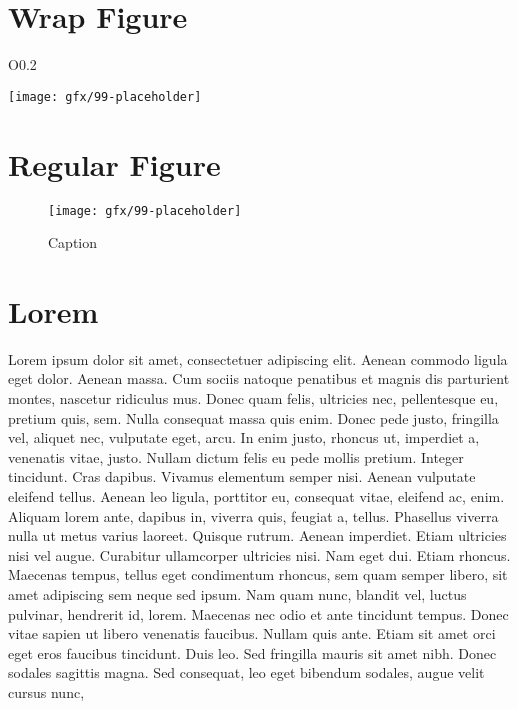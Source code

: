 \section{Wrap Figure}
\begin{wrapfigure}{O}{0.2\textwidth}
	\caption{} %
	\label{03:fig02} 
	\centering
	\texttt{[image: gfx/99-placeholder]} 
\end{wrapfigure}


\section{Regular Figure}
\begin{figure}[H]
	\centering
	\texttt{[image: gfx/99-placeholder]}
	\caption{Caption}
	\label{03:fig03}
\end{figure}



\section{Lorem}
Lorem ipsum dolor sit amet, consectetuer adipiscing elit. Aenean commodo ligula eget dolor. Aenean massa. Cum sociis natoque penatibus et magnis dis parturient montes, nascetur ridiculus mus. Donec quam felis, ultricies nec, pellentesque eu, pretium quis, sem. Nulla consequat massa quis enim. Donec pede justo, fringilla vel, aliquet nec, vulputate eget, arcu. In enim justo, rhoncus ut, imperdiet a, venenatis vitae, justo. Nullam dictum felis eu pede mollis pretium. Integer tincidunt. Cras dapibus. Vivamus elementum semper nisi. Aenean vulputate eleifend tellus. Aenean leo ligula, porttitor eu, consequat vitae, eleifend ac, enim. Aliquam lorem ante, dapibus in, viverra quis, feugiat a, tellus. Phasellus viverra nulla ut metus varius laoreet. Quisque rutrum. Aenean imperdiet. Etiam ultricies nisi vel augue. Curabitur ullamcorper ultricies nisi. Nam eget dui. Etiam rhoncus. Maecenas tempus, tellus eget condimentum rhoncus, sem quam semper libero, sit amet adipiscing sem neque sed ipsum. Nam quam nunc, blandit vel, luctus pulvinar, hendrerit id, lorem. Maecenas nec odio et ante tincidunt tempus. Donec vitae sapien ut libero venenatis faucibus. Nullam quis ante. Etiam sit amet orci eget eros faucibus tincidunt. Duis leo. Sed fringilla mauris sit amet nibh. Donec sodales sagittis magna. Sed consequat, leo eget bibendum sodales, augue velit cursus nunc,

